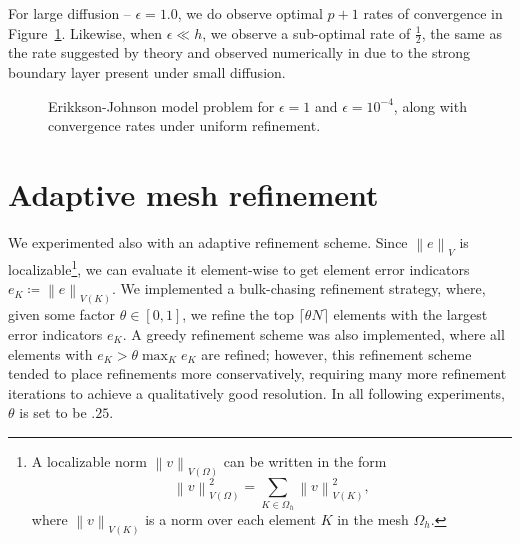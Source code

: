 \documentclass[final,leqno]{siamltex}
\newcommand{\nor}[1]{\left\| #1 \right\|}
\newcommand{\Oh}{\Omega_h}
\begin{document}
For large diffusion -- $\epsilon = 1.0$, we do observe optimal $p+1$ rates of convergence in Figure~\ref{fig:erikkson2}.  Likewise, when $\epsilon \ll h$, we observe a sub-optimal rate of $\frac{1}{2}$, the same as the rate suggested by theory and observed numerically in \cite{broersenStevenson} due to the strong boundary layer present under small diffusion.
\begin{figure}[!h]
\centering
{}
\caption{Erikkson-Johnson model problem for $\epsilon = 1$ and $\epsilon = 10^{-4}$, along with convergence rates under uniform refinement.}
\label{fig:erikkson2}
\end{figure}

\section{Adaptive mesh refinement}

We experimented also with an adaptive refinement scheme.  Since $\nor{e}_V$ is localizable\footnote{A localizable norm $\nor{v}_{V(\Omega)}$ can be written in the form 
$$\nor{v}_{V(\Omega)}^2 = \sum_{K\in \Oh} \nor{v}_{V(K)}^2,$$ where $\nor{v}_{V(K)}$ is a norm over each element $K$ in the mesh $\Oh$.}, we can evaluate it element-wise to get element error indicators $e_K \coloneqq \nor{e}_{V(K)}$.  We implemented a bulk-chasing refinement strategy, where, given some factor $\theta \in [0,1]$, we refine the top $\lceil{\theta N}\rceil$ elements with the largest error indicators $e_K$.  A greedy refinement scheme was also implemented, where all elements with $e_K > \theta \max_K e_K$ are refined; however, this refinement scheme tended to place refinements more conservatively, requiring many more refinement iterations to achieve a qualitatively good resolution.  In all following experiments, $\theta$ is set to be $.25$.  
\end{document}
